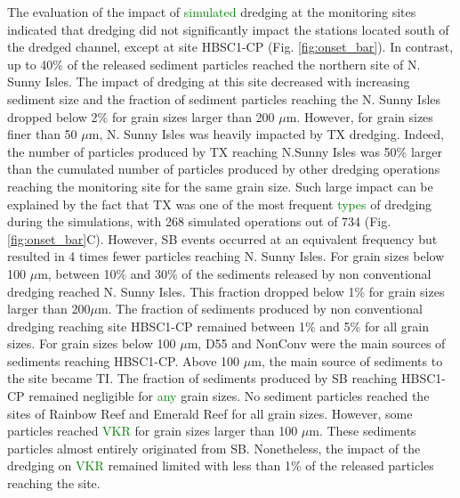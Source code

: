 \documentclass[preprint,12pt,authoryear]{elsarticle}
\newcommand{\modif}[1]{\textcolor{green}{#1}}
\begin{document}
The evaluation of the impact of \modif{simulated} dredging at the monitoring sites indicated that dredging did not significantly impact the stations located south of the dredged channel, except at site HBSC1-CP (Fig. \ref{fig:onset_bar}). In contrast, up to 40\% of the released sediment particles reached the northern site of N. Sunny Isles. The impact of dredging at this site decreased with increasing sediment size and the fraction of sediment particles reaching the N. Sunny Isles dropped below 2\% for grain sizes larger than 200 $\mu$m. However, for grain sizes finer than 50 $\mu$m, N. Sunny Isles was heavily impacted by TX dredging. Indeed, the number of particles produced by TX reaching N.Sunny Isles was 50\% larger than the cumulated number of particles produced by other dredging operations reaching the monitoring site for the same grain size. Such large impact can be explained by the fact that TX was one of the most frequent \modif{types} of dredging during the simulations, with 268 simulated operations out of 734 (Fig. \ref{fig:onset_bar}C). However, SB events occurred at an equivalent frequency but resulted in 4 times fewer particles reaching N. Sunny Isles. For grain sizes below 100 $\mu$m, between 10\% and 30\% of the sediments released by non conventional dredging reached N. Sunny Isles. This fraction dropped below  1\% for grain sizes larger than 200$\mu$m. The fraction of sediments produced by non conventional dredging reaching site HBSC1-CP remained between 1\% and 5\% for all grain sizes. For grain sizes below 100 $\mu$m, D55 and NonConv were the main sources of sediments reaching HBSC1-CP. Above 100 $\mu$m, the main source of sediments to the site became TI. The fraction of sediments produced by SB reaching HBSC1-CP remained negligible for \modif{any} grain sizes. No sediment particles reached the sites of Rainbow Reef and Emerald Reef for all grain sizes. However, some particles reached \modif{VKR} for grain sizes larger than 100 $\mu$m. These sediments particles almost entirely originated from SB. Nonetheless, the impact of the dredging on \modif{VKR} remained limited with less than 1$\%$ of the released particles reaching the site.
\end{document}

